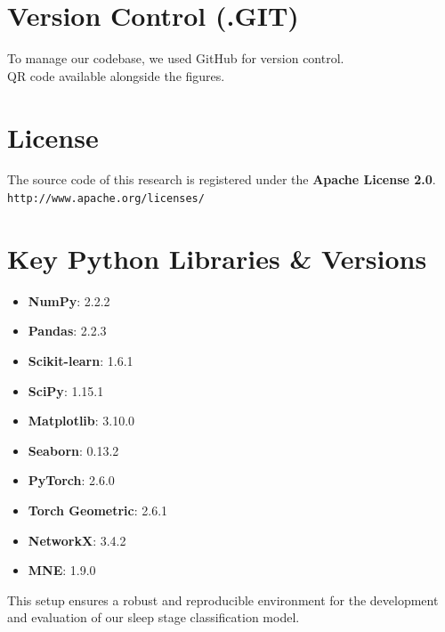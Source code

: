 \section{Version Control (.GIT)}
To manage our codebase, we used GitHub for version control.\\
QR code available alongside the figures.

\section{License}
The source code of this research is registered under the \textbf{Apache License 2.0}.\\
\texttt{http://www.apache.org/licenses/}

\section{Key Python Libraries \& Versions}
\begin{itemize}
	\item \textbf{NumPy}: 2.2.2
	\item \textbf{Pandas}: 2.2.3
	\item \textbf{Scikit-learn}: 1.6.1
	\item \textbf{SciPy}: 1.15.1
	\item \textbf{Matplotlib}: 3.10.0
	\item \textbf{Seaborn}: 0.13.2
	\item \textbf{PyTorch}: 2.6.0
	\item \textbf{Torch Geometric}: 2.6.1
	\item \textbf{NetworkX}: 3.4.2
	\item \textbf{MNE}: 1.9.0
\end{itemize}
This setup ensures a robust and reproducible environment for the development and evaluation of our sleep stage classification model.
